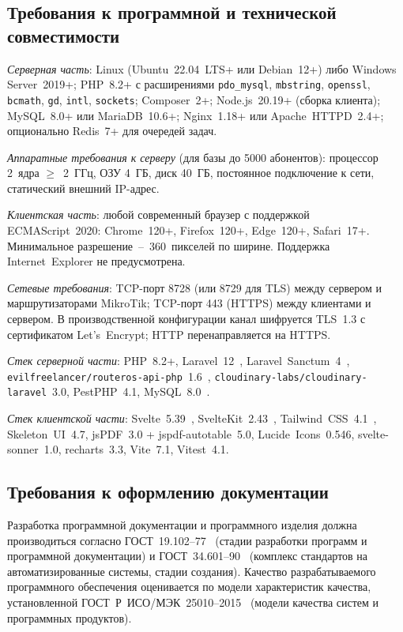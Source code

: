 \subsection{Требования к программной и технической совместимости}

\emph{Серверная часть}: Linux (Ubuntu~22.04~LTS+ или Debian~12+) либо Windows Server~2019+; PHP~8.2+ с расширениями \texttt{pdo\_mysql}, \texttt{mbstring}, \texttt{openssl}, \texttt{bcmath}, \texttt{gd}, \texttt{intl}, \texttt{sockets}; Composer~2+; Node.js~20.19+ (сборка клиента); MySQL~8.0+ или MariaDB~10.6+; Nginx~1.18+ или Apache~HTTPD~2.4+; опционально Redis~7+ для очередей задач.

\emph{Аппаратные требования к серверу} (для базы до 5000 абонентов): процессор 2~ядра $\geq$~2~ГГц, ОЗУ 4~ГБ, диск 40~ГБ, постоянное подключение к сети, статический внешний IP-адрес.

\emph{Клиентская часть}: любой современный браузер с поддержкой ECMAScript~2020: Chrome~120+, Firefox~120+, Edge~120+, Safari~17+. Минимальное разрешение~--~360~пикселей по ширине. Поддержка Internet~Explorer не предусмотрена.

\emph{Сетевые требования}: TCP-порт 8728 (или 8729 для TLS) между сервером и маршрутизаторами MikroTik; TCP-порт 443 (HTTPS) между клиентами и сервером. В производственной конфигурации канал шифруется TLS~1.3 с сертификатом Let's~Encrypt; HTTP перенаправляется на HTTPS.

\emph{Стек серверной части}: PHP~8.2+, Laravel~12~\cite{laraveldoc}, Laravel~Sanctum~4~\cite{sanctum}, \texttt{evilfreelancer/routeros-api-php}~1.6~\cite{routerosphp}, \texttt{cloudinary-labs/cloudinary-laravel}~3.0, PestPHP~4.1, MySQL~8.0~\cite{mysqldoc}.

\emph{Стек клиентской части}: Svelte~5.39~\cite{sveltedoc}, SvelteKit~2.43~\cite{sveltekitdoc}, Tailwind~CSS~4.1~\cite{tailwind}, Skeleton~UI~4.7, jsPDF~3.0 + jspdf-autotable~5.0, Lucide~Icons~0.546, svelte-sonner~1.0, recharts~3.3, Vite~7.1, Vitest~4.1.

\subsection{Требования к оформлению документации}

Разработка программной документации и программного изделия должна производиться согласно ГОСТ~19.102--77~\cite{gost19102} (стадии разработки программ и программной документации) и ГОСТ~34.601--90~\cite{gost34601} (комплекс стандартов на автоматизированные системы, стадии создания). Качество разрабатываемого программного обеспечения оценивается по модели характеристик качества, установленной ГОСТ~Р~ИСО/МЭК~25010--2015~\cite{gost25010} (модели качества систем и программных продуктов).

